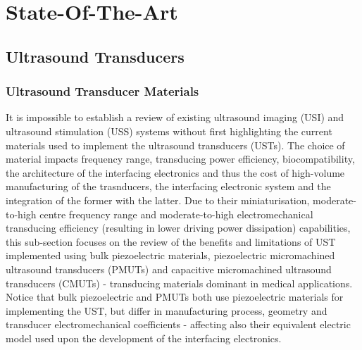
%

\makeatletter
\newcommand{\ntifpkgloaded}{%
  \@ifpackageloaded%
}
\makeatother

\chapter{State-Of-The-Art}
\label{cha:state_of_the_art}


\section{Ultrasound Transducers}
\label{sec:ultrasound_transducers}

\subsection{Ultrasound Transducer Materials}
\label{subsec:ultrasound_trasnducer_materials}

It is impossible to establish a review of existing ultrasound imaging (USI) and ultrasound stimulation (USS) systems without first highlighting the current materials used to implement the ultrasound transducers (USTs). The choice of material impacts frequency range, transducing power efficiency, biocompatibility, the architecture of the interfacing electronics and thus the cost of high-volume manufacturing of the trasnducers, the interfacing electronic system and the integration of the former with the latter. Due to their miniaturisation, moderate-to-high centre frequency range and moderate-to-high electromechanical transducing efficiency (resulting in lower driving power dissipation) capabilities, this sub-section focuses on the review of the benefits and limitations of UST implemented using bulk piezoelectric materials, piezoelectric micromachined ultrasound transducers (PMUTs) and capacitive micromachined ultrasound transducers (CMUTs) - transducing materials dominant in medical applications. Notice that bulk piezoelectric and PMUTs both use piezoelectric materials for implementing the UST, but differ in manufacturing process, geometry and transducer electromechanical coefficients - affecting also their equivalent electric model used upon the development of the interfacing electronics.

